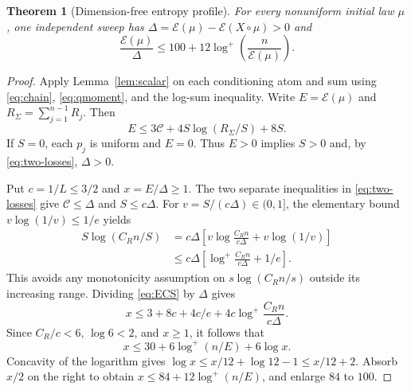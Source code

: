 \documentclass[11pt]{article}
\numberwithin{equation}{section}
\newtheorem{theorem}{Theorem}[section]
\theoremstyle{definition}\newtheorem{definition}[theorem]{Definition}
\theoremstyle{remark}\newtheorem{remark}[theorem]{Remark}
\newcommand{\Ent}{\mathcal E}
\begin{document}
\begin{theorem}[Dimension-free entropy profile]\label{thm:entropy}
For every nonuniform initial law $\mu$, one independent sweep has
$\Delta=\Ent(\mu)-\Ent(X\circ\mu)>0$ and
\begin{equation}\label{eq:entropy-profile}
 \frac{\Ent(\mu)}{\Delta}
 \le100+12\log^+\!\left(\frac n{\Ent(\mu)}\right).
\end{equation}
\end{theorem}
\begin{proof}
Apply Lemma~\ref{lem:scalar} on each conditioning atom and sum using
\eqref{eq:chain}, \eqref{eq:qmoment}, and the log-sum inequality. Write
$E=\Ent(\mu)$ and $R_\Sigma=\sum_{j=1}^{n-1}R_j$. Then
\begin{equation}\label{eq:ECS}
 E\le3\mathcal C+4S\log(R_\Sigma/S)+8S.
\end{equation}
If $S=0$, each $p_j$ is uniform and $E=0$. Thus $E>0$ implies $S>0$ and,
by \eqref{eq:two-losses}, $\Delta>0$.

Put $c=1/L\le3/2$ and $x=E/\Delta\ge1$. The two separate inequalities
in \eqref{eq:two-losses} give $\mathcal C\le\Delta$ and $S\le c\Delta$.
For $v=S/(c\Delta)\in(0,1]$, the elementary bound
$v\log(1/v)\le1/e$ yields
\begin{align*}
 S\log(C_Rn/S)
 &=c\Delta\left[v\log\frac{C_Rn}{c\Delta}+v\log(1/v)\right]\\
 &\le c\Delta\left[\log^+\frac{C_Rn}{c\Delta}+1/e\right].
\end{align*}
This avoids any monotonicity assumption on $s\log(C_Rn/s)$ outside its
increasing range. Dividing \eqref{eq:ECS} by $\Delta$ gives
\[
 x\le3+8c+4c/e+4c\log^+\frac{C_Rn}{c\Delta}.
\]
Since $C_R/c<6$, $\log6<2$, and $x\ge1$, it follows that
\[
 x\le30+6\log^+(n/E)+6\log x.
\]
Concavity of the logarithm gives
$\log x\le x/12+\log12-1\le x/12+2$. Absorb $x/2$ on the right to obtain
$x\le84+12\log^+(n/E)$, and enlarge $84$ to $100$.
\end{proof}
\end{document}
